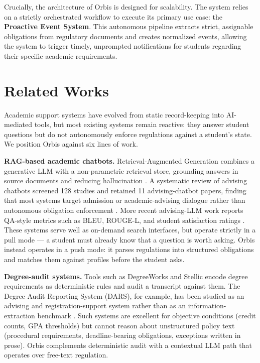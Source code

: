 \documentclass[a4paper,12pt]{article}
\begin{document}
Crucially, the architecture of Orbis is designed for scalability. The system relies on a strictly orchestrated workflow to execute its primary use case: the \textbf{Proactive Event System}. This autonomous pipeline extracts strict, assignable obligations from regulatory documents and creates normalized events, allowing the system to trigger timely, unprompted notifications for students regarding their specific academic requirements.

\section{Related Works}
Academic support systems have evolved from static record-keeping into AI-mediated tools, but most existing systems remain reactive: they answer student questions but do not autonomously enforce regulations against a student's state. We position Orbis against six lines of work.

\textbf{RAG-based academic chatbots.} Retrieval-Augmented Generation combines a generative LLM with a non-parametric retrieval store, grounding answers in source documents and reducing hallucination \cite{lewis2020retrieval}. A systematic review of advising chatbots screened 128 studies and retained 11 advising-chatbot papers, finding that most systems target admission or academic-advising dialogue rather than autonomous obligation enforcement \cite{assayed2024systematic}. More recent advising-LLM work reports QA-style metrics such as BLEU, ROUGE-L, and student satisfaction ratings \cite{ismail2025academic}. These systems serve well as on-demand search interfaces, but operate strictly in a pull mode --- a student must already know that a question is worth asking. Orbis instead operates in a push mode: it parses regulations into structured obligations and matches them against profiles before the student asks.

\textbf{Degree-audit systems.} Tools such as DegreeWorks and Stellic encode degree requirements as deterministic rules and audit a transcript against them. The Degree Audit Reporting System (DARS), for example, has been studied as an advising and registration-support system rather than as an information-extraction benchmark \cite{wick2023dars}. Such systems are excellent for objective conditions (credit counts, GPA thresholds) but cannot reason about unstructured policy text (procedural requirements, deadline-bearing obligations, exceptions written in prose). Orbis complements deterministic audit with a contextual LLM path that operates over free-text regulation.
\end{document}
